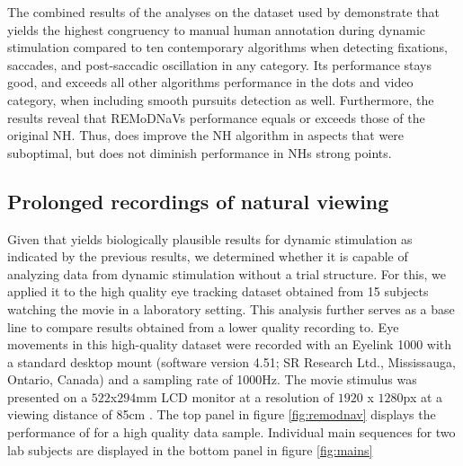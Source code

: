 The combined results of the analyses on the dataset used by
\citet{Andersson2017} demonstrate that \remodnav yields the highest congruency
to manual human annotation during dynamic stimulation compared to ten
contemporary algorithms when detecting fixations, saccades, and post-saccadic
oscillation in any category. Its performance stays good, and exceeds all other
algorithms performance in the dots and video category, when including smooth
pursuits detection as well. Furthermore, the results reveal that REMoDNaVs
performance equals or exceeds those of the original NH. Thus, \remodnav does
improve the NH algorithm in aspects that were suboptimal, but does not diminish
performance in NHs strong points.


\subsection*{Prolonged recordings of natural viewing}\label{ana_2}




Given that \remodnav yields biologically plausible results for dynamic
stimulation as indicated by the previous results, we determined whether it is
capable of analyzing data from dynamic stimulation without a trial structure.
For this, we applied it to the high quality eye tracking dataset obtained from
15 subjects watching the movie in a laboratory setting. This analysis further
serves as a base line to compare results obtained from a lower quality
recording to. Eye movements in this high-quality dataset were recorded with an
Eyelink 1000 with a standard desktop mount (software version 4.51; SR Research
Ltd., Mississauga, Ontario, Canada) and a sampling rate of 1000Hz. The movie
stimulus was presented on a $522$x$294$mm LCD monitor at a resolution of $1920$
x $1280$px at a viewing distance of 85cm \citep{Hanke2016}.  The top panel in
figure \ref{fig:remodnav} displays the performance of \remodnav for a high
quality data sample.  Individual main sequences for two lab subjects are
displayed in the bottom panel in figure \ref{fig:mains}

